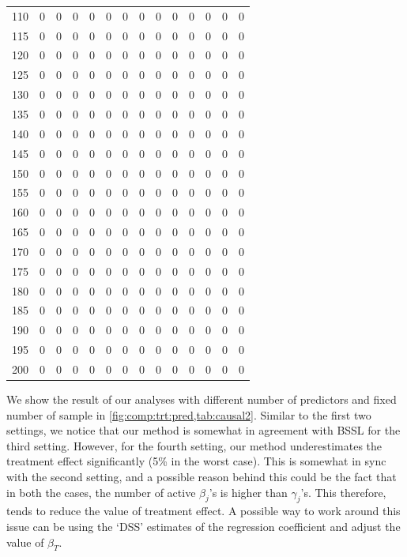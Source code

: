\documentclass[preprint,12pt]{elsarticle}
\begin{document}
\begin{table}
\begin{tabular}{|c||rrr|r||rr|r||rr|r||rr|r|}
  110 &   0 &   0 &   0 &  0 &   0 &   0 &   0 &   0 &   0 &   0 &   0&   0&   0\\ 
  115 &   0 &   0 &   0 &  0 &   0 &   0 &   0 &   0 &   0 &   0 &   0&   0&   0\\ 
  120 &   0 &   0 &   0 &  0 &   0 &   0 &   0 &   0 &   0 &   0 &   0&   0&   0\\ 
  125 &   0 &   0 &   0 &  0 &   0 &   0 &   0 &   0 &   0 &   0 &   0&   0&   0\\ 
  130 &   0 &   0 &   0 &  0 &   0 &   0 &   0 &   0 &   0 &   0 &   0&   0&   0\\ 
  135 &   0 &   0 &   0 &  0 &   0 &   0 &   0 &   0 &   0 &   0 &   0&   0&   0\\ 
  140 &   0 &   0 &   0 &  0 &   0 &   0 &   0 &   0 &   0 &   0 &   0&   0&   0\\ 
  145 &   0 &   0 &   0 &  0 &   0 &   0 &   0 &   0 &   0 &   0 &   0&   0&   0\\ 
  150 &   0 &   0 &   0 &  0 &   0 &   0 &   0 &   0 &   0 &   0 &   0&   0&   0\\ 
  155 &   0 &   0 &   0 &  0 &   0 &   0 &   0 &   0 &   0 &   0 &   0&   0&   0\\ 
  160 &   0 &   0 &   0 &  0 &   0 &   0 &   0 &   0 &   0 &   0 &   0&   0&   0\\ 
  165 &   0 &   0 &   0 &  0 &   0 &   0 &   0 &   0 &   0 &   0 &   0&   0&   0\\ 
  170 &   0 &   0 &   0 &  0 &   0 &   0 &   0 &   0 &   0 &   0 &   0&   0&   0\\ 
  175 &   0 &   0 &   0 &  0 &   0 &   0 &   0 &   0 &   0 &   0 &   0&   0&   0\\ 
  180 &   0 &   0 &   0 &  0 &   0 &   0 &   0 &   0 &   0 &   0 &   0&   0&   0\\ 
  185 &   0 &   0 &   0 &  0 &   0 &   0 &   0 &   0 &   0 &   0 &   0&   0&   0\\ 
  190 &   0 &   0 &   0 &  0 &   0 &   0 &   0 &   0 &   0 &   0 &   0&   0&   0\\ 
  195 &   0 &   0 &   0 &  0 &   0 &   0 &   0 &   0 &   0 &   0 &   0&   0&   0\\ 
  200 &   0 &   0 &   0 &  0 &   0 &   0 &   0 &   0 &   0 &   0 &   0&   0&   0\\ 
   \hline
\end{tabular}
\end{table}

We show the result of our analyses with different number of predictors and
fixed number of sample in \cref{fig:comp:trt:pred,tab:causal2}. Similar to
the first two settings, we notice that our method is somewhat in agreement with
BSSL for the third setting. However, for the fourth setting, our method
underestimates the treatment effect significantly (5\% in the worst case). This
is somewhat in sync with the second setting, and a possible reason behind this
could be the fact that in both the cases, the number of active $\beta_j$'s is
higher than $\gamma_j$'s. This therefore, tends to reduce the value of treatment
effect. A possible way to work around this issue can be using the `DSS' estimates
of the regression coefficient and adjust the value of $\beta_T$. 
\end{document}
